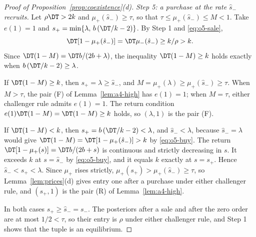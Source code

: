 \begin{proof}[Proof of Proposition~\ref{prop:coexistence}(d)]
\emph{Step 5: a purchase at the rate \(\hat s_-\) recruits.} Let \(\rho\DT>2k\) and \(\mu_+(\hat s_-)\ge\tau\), so that
\(\tau\le\mu_+(\hat s_-)\le M<1\). Take \(e(1)=1\) and \(s_+=\min\{\lambda,\,b\,(\DT/k-2)\}\). By Step 1 and
\eqref{eq:o5-sale},
\begin{equation}\label{eq:o5-buy}
\DT[1-\mu_+(\hat s_-)]=\DT\mu_-(\hat s_-)\ge k/\rho>k .
\end{equation}
Since \(\DT(1-M)=\DT b/(2b+\lambda)\), the inequality \(\DT(1-M)\ge k\) holds exactly when \(b\,(\DT/k-2)\ge\lambda\).

If \(\DT(1-M)\ge k\), then \(s_+=\lambda\ge\hat s_-\), and \(M=\mu_+(\lambda)\ge\mu_+(\hat s_-)\ge\tau\). When \(M>\tau\), the pair
(F) of Lemma~\ref{lem:a4-high} has \(e(1)=1\); when \(M=\tau\), either challenger rule admits \(e(1)=1\). The return
condition \(e(1)\DT(1-M)=\DT(1-M)\ge k\) holds, so \((\lambda,1)\) is the pair (F).

If \(\DT(1-M)<k\), then \(s_+=b\,(\DT/k-2)<\lambda\), and \(\hat s_-<\lambda\), because \(\hat s_-=\lambda\) would give
\(\DT(1-M)=\DT[1-\mu_+(\hat s_-)]>k\) by \eqref{eq:o5-buy}. The return \(\DT[1-\mu_+(s)]=\DT b/(2b+s)\) is continuous and
strictly decreasing in \(s\). It exceeds \(k\) at \(s=\hat s_-\) by \eqref{eq:o5-buy}, and it equals \(k\) exactly at
\(s=s_+\). Hence \(\hat s_-<s_+<\lambda\). Since \(\mu_+\) rises strictly, \(\mu_+(s_+)>\mu_+(\hat s_-)\ge\tau\), so
Lemma~\ref{lem:prices}(d) gives entry one after a purchase under either challenger rule, and \((s_+,1)\) is the pair
(R) of Lemma~\ref{lem:a4-high}.

In both cases \(s_+\ge\hat s_-=s_-\). The posteriors after a sale and after the zero order are at most \(1/2<\tau\), so
their entry is \(\rho\) under either challenger rule, and Step 1 shows that the tuple is an equilibrium.
\end{proof}
